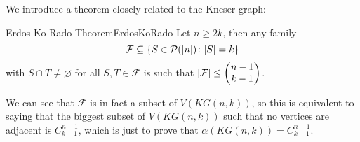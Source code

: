 \documentclass[math, code]{amznotes}
\theoremstyle{remark}
\begin{document}
We introduce a theorem closely related to the Kneser graph:
\begin{thmbox}{Erdos-Ko-Rado Theorem}{ErdosKoRado}
    Let $n \geq 2k$, then any family
    \begin{equation*}
        \mathcal{F} \subseteq \left\{S \in \mathcal{P}([n]) \colon {\left\lvert {S} \right\rvert} = k\right\}
    \end{equation*}
    with $S \cap T \neq \varnothing$ for all $S, T \in \mathcal{F}$ is such that ${\left\lvert {\mathcal{F}} \right\rvert} \leq \begin{pmatrix}
        n - 1 \\
        k - 1
    \end{pmatrix}$.
\end{thmbox}
We can see that $\mathcal{F}$ is in fact a subset of $V(KG(n, k))$, so this is equivalent to saying that the biggest subset of $V(KG(n, k))$ such that no vertices are adjacent is $C^{n - 1}_{k - 1}$, which is just to prove that $\alpha(KG(n, k)) = C^{n - 1}_{k - 1}$.
\end{document}
